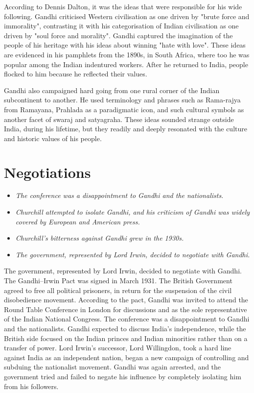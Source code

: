 According to Dennis Dalton, it was the ideas that were responsible for
his wide following. Gandhi criticised Western civilisation as one driven
by "brute force and immorality", contrasting it with his categorisation
of Indian civilisation as one driven by "soul force and morality".
Gandhi captured the imagination of the people of his heritage with his
ideas about winning "hate with love". These ideas are evidenced in his
pamphlets from the 1890s, in South Africa, where too he was popular
among the Indian indentured workers. After he returned to India, people
flocked to him because he reflected their values.

Gandhi also campaigned hard going from one rural corner of the Indian
subcontinent to another. He used terminology and phrases such as
Rama-rajya from Ramayana, Prahlada as a paradigmatic icon, and such
cultural symbols as another facet of swaraj and satyagraha. These ideas
sounded strange outside India, during his lifetime, but they readily and
deeply resonated with the culture and historic values of his people.

\section{Negotiations}\label{negotiations}

\begin{itemize}
\item
  \emph{The conference was a disappointment to Gandhi and the
  nationalists.}
\item
  \emph{Churchill attempted to isolate Gandhi, and his criticism of
  Gandhi was widely covered by European and American press.}
\item
  \emph{Churchill's bitterness against Gandhi grew in the 1930s.}
\item
  \emph{The government, represented by Lord Irwin, decided to negotiate
  with Gandhi.}
\end{itemize}

The government, represented by Lord Irwin, decided to negotiate with
Gandhi. The Gandhi--Irwin Pact was signed in March 1931. The British
Government agreed to free all political prisoners, in return for the
suspension of the civil disobedience movement. According to the pact,
Gandhi was invited to attend the Round Table Conference in London for
discussions and as the sole representative of the Indian National
Congress. The conference was a disappointment to Gandhi and the
nationalists. Gandhi expected to discuss India's independence, while the
British side focused on the Indian princes and Indian minorities rather
than on a transfer of power. Lord Irwin's successor, Lord Willingdon,
took a hard line against India as an independent nation, began a new
campaign of controlling and subduing the nationalist movement. Gandhi
was again arrested, and the government tried and failed to negate his
influence by completely isolating him from his followers.

